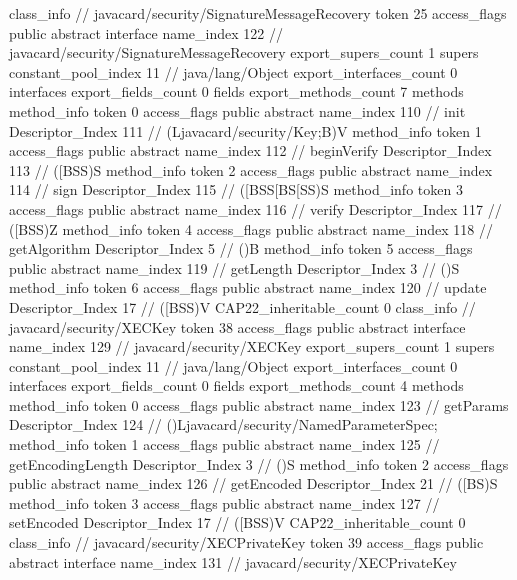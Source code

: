 {{{		}
		class_info {		// javacard/security/SignatureMessageRecovery
			token	25
			access_flags	public abstract interface
			name_index	122		// javacard/security/SignatureMessageRecovery
			export_supers_count	1
			supers {
				constant_pool_index	11		// java/lang/Object
			}
			export_interfaces_count	0
			interfaces {
			}
			export_fields_count	0
			fields {
			}
			export_methods_count	7
			methods {
				method_info {
					token	0
					access_flags	public abstract
					name_index	110		// init
					Descriptor_Index	111		// (Ljavacard/security/Key;B)V
				}
				method_info {
					token	1
					access_flags	public abstract
					name_index	112		// beginVerify
					Descriptor_Index	113		// ([BSS)S
				}
				method_info {
					token	2
					access_flags	public abstract
					name_index	114		// sign
					Descriptor_Index	115		// ([BSS[BS[SS)S
				}
				method_info {
					token	3
					access_flags	public abstract
					name_index	116		// verify
					Descriptor_Index	117		// ([BSS)Z
				}
				method_info {
					token	4
					access_flags	public abstract
					name_index	118		// getAlgorithm
					Descriptor_Index	5		// ()B
				}
				method_info {
					token	5
					access_flags	public abstract
					name_index	119		// getLength
					Descriptor_Index	3		// ()S
				}
				method_info {
					token	6
					access_flags	public abstract
					name_index	120		// update
					Descriptor_Index	17		// ([BSS)V
				}
			}
			CAP22_inheritable_count	0
		}
		class_info {		// javacard/security/XECKey
			token	38
			access_flags	public abstract interface
			name_index	129		// javacard/security/XECKey
			export_supers_count	1
			supers {
				constant_pool_index	11		// java/lang/Object
			}
			export_interfaces_count	0
			interfaces {
			}
			export_fields_count	0
			fields {
			}
			export_methods_count	4
			methods {
				method_info {
					token	0
					access_flags	public abstract
					name_index	123		// getParams
					Descriptor_Index	124		// ()Ljavacard/security/NamedParameterSpec;
				}
				method_info {
					token	1
					access_flags	public abstract
					name_index	125		// getEncodingLength
					Descriptor_Index	3		// ()S
				}
				method_info {
					token	2
					access_flags	public abstract
					name_index	126		// getEncoded
					Descriptor_Index	21		// ([BS)S
				}
				method_info {
					token	3
					access_flags	public abstract
					name_index	127		// setEncoded
					Descriptor_Index	17		// ([BSS)V
				}
			}
			CAP22_inheritable_count	0
		}
		class_info {		// javacard/security/XECPrivateKey
			token	39
			access_flags	public abstract interface
			name_index	131		// javacard/security/XECPrivateKey
}}}
